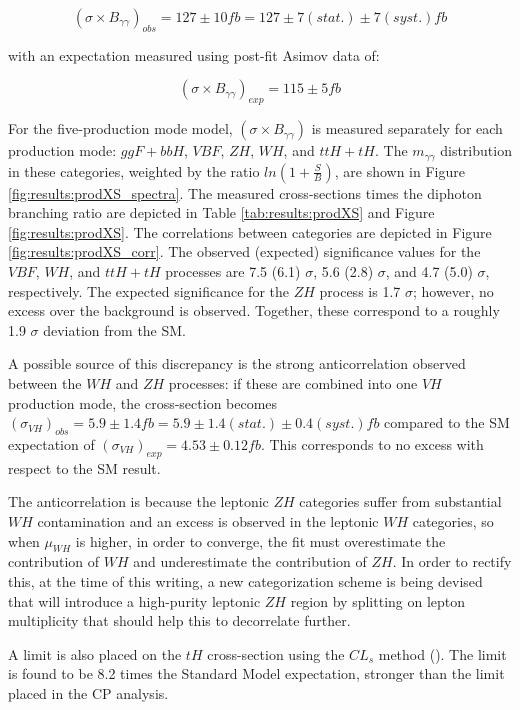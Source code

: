 \begin{equation}
(\sigma \times B_{\gamma \gamma})_{obs} =127 \pm 10 fb=127 \pm 7(stat.) \pm 7(syst.)fb
\end{equation}

with an expectation measured using post-fit Asimov data of:

\begin{equation}
(\sigma \times B_{\gamma \gamma})_{exp} =115 \pm 5 fb
\end{equation}

For the five-production mode model, $(\sigma \times B_{\gamma \gamma})$ is measured separately for each production mode: $ggF+bbH$, $VBF$, $ZH$, $WH$, and $ttH+tH$. The $m_{\gamma\gamma}$ distribution in these categories, weighted by the ratio $ln(1+\frac{S}{B})$, are shown in Figure \ref{fig:results:prodXS_spectra}. The measured cross-sections times the diphoton branching ratio are depicted in Table \ref{tab:results:prodXS} and Figure \ref{fig:results:prodXS}. The correlations between categories are depicted in Figure \ref{fig:results:prodXS_corr}. The observed (expected) significance values for the $VBF$, $WH$, and $ttH+tH$ processes are 7.5 (6.1) $\sigma$, 5.6 (2.8) $\sigma$, and 4.7 (5.0) $\sigma$, respectively. The expected significance for the $ZH$ process is 1.7 $\sigma$; however, no excess over the background is observed. Together, these correspond to a roughly 1.9 $\sigma$ deviation from the SM.

A possible source of this discrepancy is the strong anticorrelation observed between the $WH$ and $ZH$ processes: if these are combined into one $VH$ production mode, the cross-section becomes $(\sigma_{VH})_{obs} = 5.9 \pm 1.4fb = 5.9 \pm 1.4(stat.) \pm 0.4(syst.)fb$ compared to the SM expectation of $(\sigma_{VH})_{exp}=4.53 \pm 0.12fb$. This corresponds to no excess with respect to the SM result.

The anticorrelation is because the leptonic $ZH$ categories suffer from substantial $WH$ contamination and an excess is observed in the leptonic $WH$ categories, so when $\mu_{WH}$ is higher, in order to converge, the fit must overestimate the contribution of $WH$ and underestimate the contribution of $ZH$. In order to rectify this, at the time of this writing, a new categorization scheme is being devised that will introduce a high-purity leptonic $ZH$ region by splitting on lepton multiplicity that should help this to decorrelate further.

A limit is also placed on the $tH$ cross-section using the $CL_{s}$ method (\cite{CLs}). The limit is found to be 8.2 times the Standard Model expectation, stronger than the limit placed in the CP analysis. 

